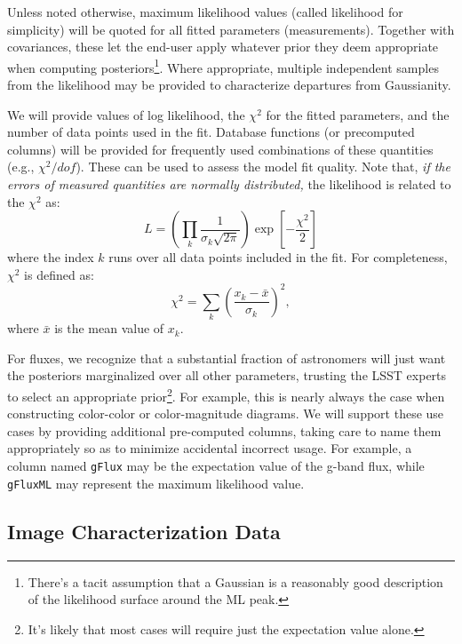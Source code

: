 \documentclass[SE,lsstdraft,toc]{lsstdoc}
\begin{document}
Unless noted otherwise, maximum likelihood values (called likelihood for simplicity) will be quoted for all fitted parameters (measurements). Together with covariances, these let the end-user apply whatever prior they deem appropriate when computing posteriors\footnote{There's a tacit assumption that a Gaussian is a reasonably good description of the likelihood surface around the ML peak.}. Where appropriate, multiple independent samples from the likelihood may be provided to characterize departures from Gaussianity.

We will provide values of log likelihood, the $\chi^2$ for the fitted parameters, and the number of data points used in the fit. Database functions (or precomputed columns) will be provided for frequently used combinations of these quantities (e.g., $\chi^2/dof$). These can be used to assess the model fit quality. Note that, \textit{if the errors of measured quantities are normally distributed,} the likelihood is related to the $\chi^2$ as:
%
\begin{equation}
    L = \left(\prod_{k}\frac{1}{\sigma_k \sqrt{2 \pi}}\right) \exp \left[- \frac{\chi^2}{2}\right]
\end{equation}
%
where the index $k$ runs over all data points included in the fit.
For completeness, $\chi^2$ is defined as:
%
\begin{equation}
      \chi^2 = \sum_{k} \left( \frac{x_k-\bar{x}}{\sigma_k}\right)^2,
\end{equation}
%
where $\bar{x}$ is the mean value of $x_k$.

For fluxes, we recognize that a substantial fraction of astronomers will just want the posteriors marginalized over all other parameters, trusting the LSST experts to select an appropriate prior\footnote{It's likely that most cases will require just the expectation value alone.}. For example, this is nearly always the case when constructing color-color or color-magnitude diagrams. We will support these use cases by providing additional pre-computed columns, taking care to name them appropriately so as to minimize accidental incorrect usage. For example, a column named \texttt{gFlux} may be the expectation value of the g-band flux, while \texttt{gFluxML} may represent the maximum likelihood value.

\subsection{Image Characterization Data}
\end{document}
